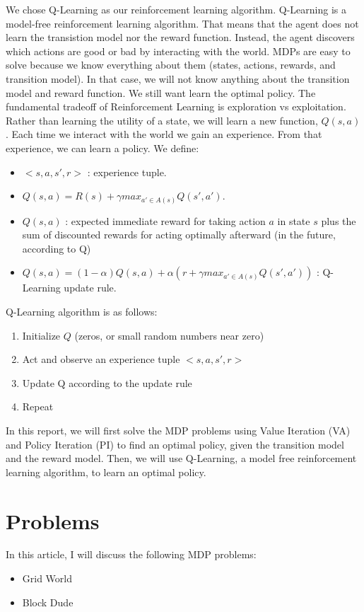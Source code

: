 \documentclass[10pt, twocolumn]{article}
\begin{document}
		We chose Q-Learning as our reinforcement learning algorithm. Q-Learning is a model-free reinforcement learning algorithm. That means that the agent does not learn the transistion model nor the reward function. Instead, the agent discovers which actions are good or bad by interacting with the world. MDPs are easy to solve because we know everything about them (states, actions, rewards, and transition model). In that case, we will not know anything about the transition model and reward function. We still want learn the optimal policy. The fundamental tradeoff of Reinforcement Learning is exploration vs exploitation. Rather than learning the utility of a state, we will learn a new function, $Q(s, a)$. Each time we interact with the world we gain an experience. From that experience, we can learn a policy. We define:
		\begin{itemize}
			\item $<s, a, s', r>$ : experience tuple.
			\item $Q(s, a) = R(s) + \gamma max_{a' \in A(s)} Q(s', a')$.
			\item $Q(s, a)$ : expected immediate reward for taking action $a$ in state $s$ plus the sum of discounted rewards for acting optimally afterward (in the future, according to Q)
			\item $Q(s, a) = (1 - \alpha) Q(s, a) + \alpha (r + \gamma max_{a' \in A(s)} Q(s', a'))$ : Q-Learning update rule.
		\end{itemize}
		Q-Learning algorithm is as follows:
		\begin{enumerate}
			\item Initialize $Q$ (zeros, or small random numbers near zero)
			\item Act and observe an experience tuple $<s, a, s', r>$
			\item Update Q according to the update rule
			\item Repeat
		\end{enumerate}

		In this report, we will first solve the MDP problems using Value Iteration (VA) and Policy Iteration (PI) to find an optimal policy, given the transition model and the reward model. Then, we will use Q-Learning, a model free reinforcement learning algorithm, to learn an optimal policy.
	\section{Problems}
		In this article, I will discuss the following MDP problems:
		\begin{itemize}
			\item Grid World
			\item Block Dude
		\end{itemize}
\end{document}
